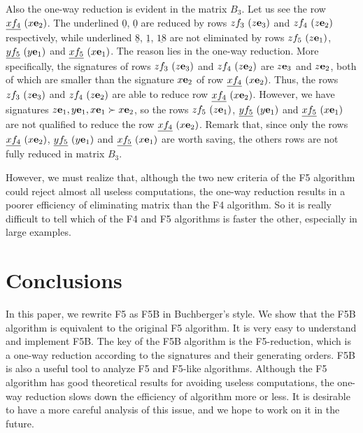 \documentclass[preprint,authoryear,3p,12pt]{elsarticle}
\def\eb{{\bf e}}
\begin{document}
Also the one-way reduction is evident in the matrix $B_3$. Let us
see the row $\underline{xf_4}\ (x\eb_2)$. The underlined
$\underline{0}$, $\underline{0}$ are reduced by rows $zf_3\
(z\eb_3)$ and $zf_4\ (z\eb_2)$ respectively, while underlined
$\underline{8}$, $\underline{1}$, $\underline{18}$ are not
eliminated by rows $zf_5\ (z\eb_1)$, $\underline{yf_5}\ (y\eb_1)$
and $\underline{xf_5}\ (x\eb_1)$. The reason lies in the one-way
reduction. More specifically, the signatures of rows $zf_3\
(z\eb_3)$ and $zf_4\ (z\eb_2)$ are $z\eb_3$ and $z\eb_2$, both of
which are smaller than the signature $x\eb_2$ of row
$\underline{xf_4}\ (x\eb_2)$. Thus, the rows  $zf_3\ (z\eb_3)$ and
$zf_4\ (z\eb_2)$ are able to reduce row $\underline{xf_4}\
(x\eb_2)$. However, we have signatures $z\eb_1, y\eb_1, x\eb_1 \succ
x\eb_2$, so the rows $zf_5\ (z\eb_1)$, $\underline{yf_5}\ (y\eb_1)$
and $\underline{xf_5}\ (x\eb_1)$ are not qualified to reduce the row
$\underline{xf_4}\ (x\eb_2)$. Remark that, since only the rows
$\underline{xf_4}\ (x\eb_2)$, $\underline{yf_5}\ (y\eb_1)$ and
$\underline{xf_5}\ (x\eb_1)$ are worth saving, the others rows are
not fully reduced in matrix $B_3$.

However, we must realize that, although the two new criteria of the
F5 algorithm could reject almost all useless computations, the
one-way reduction results in a poorer efficiency of eliminating
matrix than the F4 algorithm. So it is really difficult to tell
which of the F4 and F5 algorithms is faster the other, especially in
large examples.



\section{Conclusions}


In this paper, we rewrite  F5 as F5B in Buchberger's style. We show that the F5B algorithm is equivalent to the original F5
algorithm. It is very easy to understand and implement F5B.
 The key of the F5B algorithm is the F5-reduction, which is a one-way reduction according to the signatures and their generating orders.
  F5B  is also a useful tool to analyze  F5 and F5-like algorithms.  Although the F5 algorithm
has good theoretical results for avoiding useless computations,  the one-way reduction slows down the efficiency of algorithm
more or less. It is desirable to have a more careful analysis of this issue, and we hope to work on it in the future.
\end{document}
